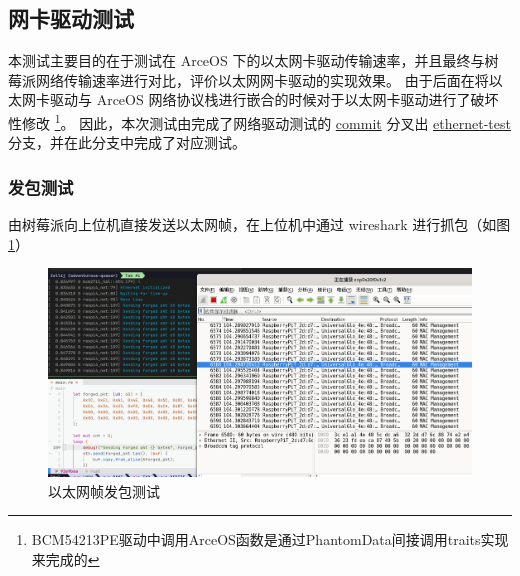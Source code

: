


    \subsection{网卡驱动测试}

    本测试主要目的在于测试在 ArceOS 下的以太网卡驱动传输速率，并且最终与树莓派网络传输速率进行对比，评价以太网网卡驱动的实现效果。
    由于后面在将以太网卡驱动与 ArceOS 网络协议栈进行嵌合的时候对于以太网卡驱动进行了破坏性修改
    \footnote{BCM54213PE驱动中调用ArceOS函数是通过PhantomData间接调用traits实现来完成的}。
    因此，本次测试由完成了网络驱动测试的 \href{https://bitbucket.org/jackyliu16/arceos/commits/92e9b6abcdf180359381088552688c0fcbc83bf2}{commit} 
    分叉出 \href{https://bitbucket.org/jackyliu16/arceos/commits/branch/ethernet-test}{ethernet-test}
    分支，并在此分支中完成了对应测试。

    \subsubsection{发包测试}

    由树莓派向上位机直接发送以太网帧，在上位机中通过 wireshark 进行抓包（如图\ref{test::以太网帧发送}）

    \begin{figure}[ht]
        \centering
        \includegraphics[width=\textwidth]{./imgs/以太网帧通信正常.jpg}
        \caption{以太网帧发包测试}    \label{test::以太网帧发送}
    \end{figure}   

